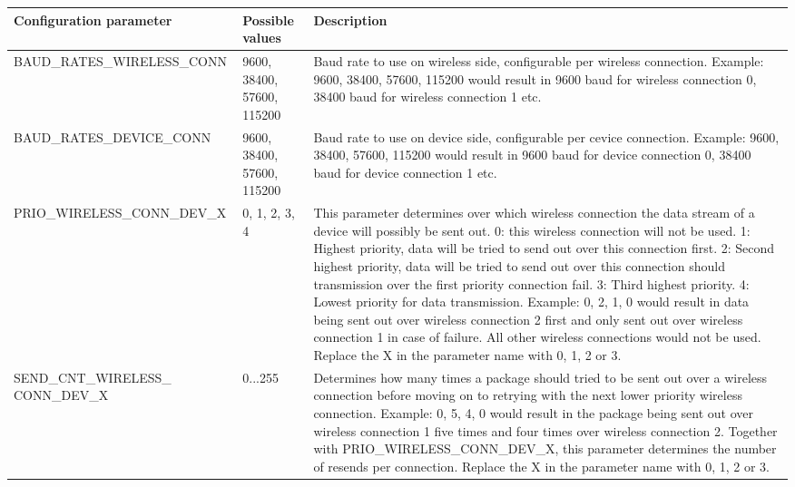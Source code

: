 \begin{center}
    \begin{longtable}{p{6cm}p{1cm}p{7cm}}
        \hline
        \textbf{Configuration parameter} & \textbf{Possible values} & \textbf{Description} \\
        \hline
        BAUD\_RATES\_WIRELESS\_CONN & 9600, 38400, 57600, 115200 & 
        Baud rate to use on wireless side, configurable per wireless connection. Example: {9600, 38400, 57600, 115200} would result in 9600 baud for wireless connection 0, 38400 baud for wireless connection 1 etc.\\
        \hline
        BAUD\_RATES\_DEVICE\_CONN &  9600, 38400, 57600, 115200 & 
        Baud rate to use on device side, configurable per cevice connection. Example: {9600, 38400, 57600, 115200} would result in 9600 baud for device connection 0, 38400 baud for device connection 1 etc.\\
        \hline
        PRIO\_WIRELESS\_CONN\_DEV\_X &  0, 1, 2, 3, 4 & 
        This parameter determines over which wireless connection the data stream of a device will possibly be sent out. 0: this wireless connection will not be used. 1: Highest priority, data will be tried to send out over this connection first. 2: Second highest priority, data will be tried to send out over this connection should transmission over the first priority connection fail. 3: Third highest priority. 4: Lowest priority for data transmission. Example: {0, 2, 1, 0} would result in data being sent out over wireless connection 2 first and only sent out over wireless connection 1 in case of failure. All other wireless connections would not be used. Replace the X in the parameter name with 0, 1, 2 or 3.\\
        \hline
        SEND\_CNT\_WIRELESS\_ CONN\_DEV\_X &  0...255 & 
        Determines how many times a package should tried to be sent out over a wireless connection before moving on to retrying with the next lower priority wireless connection. Example: {0, 5, 4, 0} would result in the package being sent out over wireless connection 1 five times and four times over wireless connection 2. Together with PRIO\_WIRELESS\_CONN\_DEV\_X, this parameter determines the number of resends per connection. Replace the X in the parameter name with 0, 1, 2 or 3.\\

\end{longtable}
\end{center}

